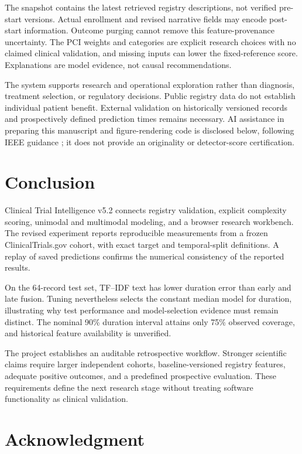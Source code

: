 \documentclass[10pt,letterpaper,twocolumn]{article}
\begin{document}
The snapshot contains the latest retrieved registry descriptions, not verified pre-start versions. Actual enrollment and revised narrative fields may encode post-start information. Outcome purging cannot remove this feature-provenance uncertainty. The PCI weights and categories are explicit research choices with no claimed clinical validation, and missing inputs can lower the fixed-reference score. Explanations are model evidence, not causal recommendations.

The system supports research and operational exploration rather than diagnosis, treatment selection, or regulatory decisions. Public registry data do not establish individual patient benefit. External validation on historically versioned records and prospectively defined prediction times remains necessary. AI assistance in preparing this manuscript and figure-rendering code is disclosed below, following IEEE guidance \cite{ieeeaccessprep}; it does not provide an originality or detector-score certification.

\section{Conclusion}

Clinical Trial Intelligence v5.2 connects registry validation, explicit complexity scoring, unimodal and multimodal modeling, and a browser research workbench. The revised experiment reports reproducible measurements from a frozen ClinicalTrials.gov cohort, with exact target and temporal-split definitions. A replay of saved predictions confirms the numerical consistency of the reported results.

On the 64-record test set, TF--IDF text has lower duration error than early and late fusion. Tuning nevertheless selects the constant median model for duration, illustrating why test performance and model-selection evidence must remain distinct. The nominal 90\% duration interval attains only 75\% observed coverage, and historical feature availability is unverified.

The project establishes an auditable retrospective workflow. Stronger scientific claims require larger independent cohorts, baseline-versioned registry features, adequate positive outcomes, and a predefined prospective evaluation. These requirements define the next research stage without treating software functionality as clinical validation.

\section*{Acknowledgment}
\end{document}
